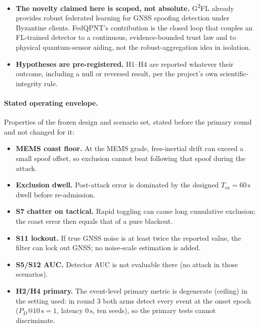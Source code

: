 \documentclass[journal]{IEEEtran}
\begin{document}
\begin{itemize}
  rigid-mode contrast roll-off rate implies a rotation-rate tolerance of only
  $\Omega_c \approx 17\,\mathrm{mrad/s}$ (field grade), well below the rotation rates of an ordinary
  vehicle turn ($\sim 0.3\,\mathrm{rad/s}$). The CAI therefore loses contrast, and its aiding becomes
  intermittent, during manoeuvring rather than only during straight-and-level segments. This is reported
  as a real effect, not corrected for, and it is expected to weaken the measured quantum benefit relative
  to an idealized always-on quantum sensor.
\item \textbf{The novelty claimed here is scoped, not absolute.} G\textsuperscript{2}FL
  \cite{liu2026g2fl} already provides robust federated learning for GNSS spoofing detection under
  Byzantine clients. FedQPNT's contribution is the closed loop that couples an FL-trained detector to a
  continuous, evidence-bounded trust law and to physical quantum-sensor aiding, not the robust-aggregation
  idea in isolation.
\item \textbf{Hypotheses are pre-registered.} H1--H4 are reported whatever their outcome, including a null or reversed
  result, per the project's own scientific-integrity rule.
\end{itemize}

\paragraph{Stated operating envelope.} Properties of the frozen design and scenario set, stated before the primary round and not changed for it:
\begin{itemize}
\item \textbf{MEMS coast floor.} At the MEMS grade, free-inertial drift can exceed a small spoof offset, so exclusion cannot beat following that spoof during the attack.
\item \textbf{Exclusion dwell.} Post-attack error is dominated by the designed $T_{\mathrm{ex}} = 60\,\mathrm{s}$ dwell before re-admission.
\item \textbf{S7 chatter on tactical.} Rapid toggling can cause long cumulative exclusion; the coast error then equals that of a pure blackout.
\item \textbf{S11 lockout.} If true GNSS noise is at least twice the reported value, the filter can lock out GNSS; no noise-scale estimation is added.
\item \textbf{S5/S12 AUC.} Detector AUC is not evaluable there (no attack in those scenarios).
\item \textbf{H2/H4 primary.} The event-level primary metric is degenerate (ceiling) in the setting used: in round 3 both arms detect every event at the onset epoch ($P_D@10\,\mathrm{s}=1$, latency $0\,\mathrm{s}$, ten seeds), so the primary tests cannot discriminate.
\end{itemize}
\end{document}
